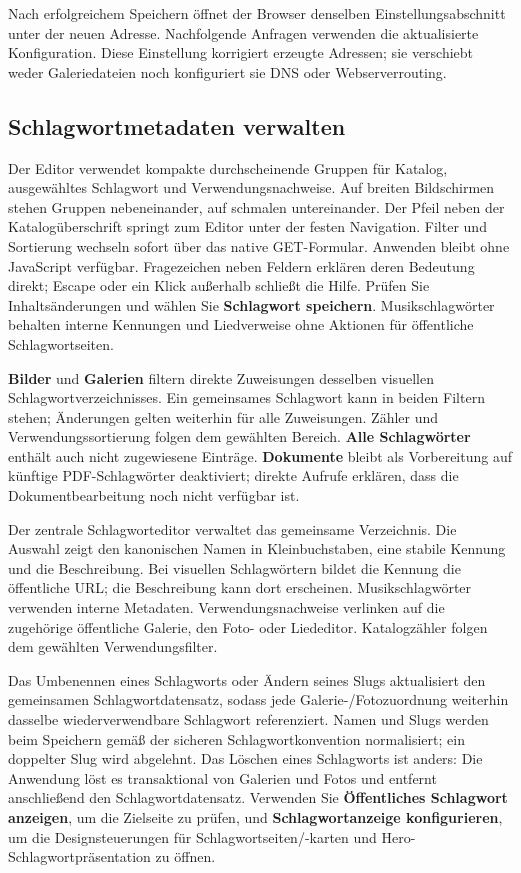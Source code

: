 \documentclass[11pt,a4paper]{article}
\newcommand{\ui}[1]{\textbf{#1}}
\begin{document}
Nach erfolgreichem Speichern öffnet der Browser denselben Einstellungsabschnitt
unter der neuen Adresse. Nachfolgende Anfragen verwenden die aktualisierte
Konfiguration. Diese Einstellung korrigiert erzeugte Adressen; sie verschiebt
weder Galeriedateien noch konfiguriert sie DNS oder Webserverrouting.

\subsection{Schlagwortmetadaten verwalten}

Der Editor verwendet kompakte durchscheinende Gruppen für Katalog,
ausgewähltes Schlagwort und Verwendungsnachweise. Auf breiten Bildschirmen
stehen Gruppen nebeneinander, auf schmalen untereinander. Der Pfeil neben der
Katalogüberschrift springt zum Editor unter der festen Navigation. Filter und
Sortierung wechseln sofort über das native GET-Formular.
Anwenden bleibt ohne JavaScript verfügbar. Fragezeichen neben Feldern
erklären deren Bedeutung direkt; Escape oder ein Klick außerhalb schließt die
Hilfe. Prüfen Sie Inhaltsänderungen und wählen Sie \ui{Schlagwort speichern}.
Musikschlagwörter behalten interne Kennungen und Liedverweise ohne Aktionen
für öffentliche Schlagwortseiten.

\ui{Bilder} und \ui{Galerien} filtern direkte Zuweisungen desselben visuellen
Schlagwortverzeichnisses. Ein gemeinsames Schlagwort kann in beiden Filtern
stehen; Änderungen gelten weiterhin für alle Zuweisungen. Zähler und
Verwendungssortierung folgen dem gewählten Bereich. \ui{Alle Schlagwörter}
enthält auch nicht zugewiesene Einträge. \ui{Dokumente} bleibt als Vorbereitung
auf künftige PDF-Schlagwörter deaktiviert; direkte Aufrufe erklären, dass die
Dokumentbearbeitung noch nicht verfügbar ist.

Der zentrale Schlagworteditor verwaltet das gemeinsame Verzeichnis. Die
Auswahl zeigt den kanonischen Namen in Kleinbuchstaben, eine stabile Kennung
und die Beschreibung. Bei visuellen Schlagwörtern bildet die Kennung die
öffentliche URL; die Beschreibung kann dort erscheinen. Musikschlagwörter
verwenden interne Metadaten. Verwendungsnachweise verlinken auf die zugehörige
öffentliche Galerie, den Foto- oder Liededitor. Katalogzähler folgen dem
gewählten Verwendungsfilter.

Das Umbenennen eines Schlagworts oder Ändern seines Slugs aktualisiert den
gemeinsamen Schlagwortdatensatz, sodass jede Galerie-/Fotozuordnung weiterhin
dasselbe wiederverwendbare Schlagwort referenziert. Namen und Slugs werden beim
Speichern gemäß der sicheren Schlagwortkonvention normalisiert; ein doppelter
Slug wird abgelehnt. Das Löschen eines Schlagworts ist anders: Die Anwendung
löst es transaktional von Galerien und Fotos und entfernt anschließend den
Schlagwortdatensatz. Verwenden Sie \ui{Öffentliches Schlagwort anzeigen}, um die
Zielseite zu prüfen, und \ui{Schlagwortanzeige konfigurieren}, um die
Designsteuerungen für Schlagwortseiten/-karten und Hero-Schlagwortpräsentation
zu öffnen.
\end{document}
